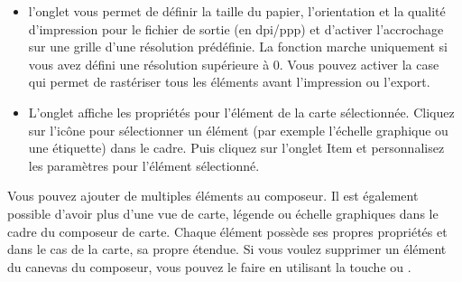 \begin{itemize}[label=--]
\item l'onglet  vous permet de définir la taille du papier, l'orientation et la qualité d'impression pour le fichier de sortie (en dpi/ppp) et d'activer l'accrochage sur une grille d'une résolution prédéfinie. La fonction  marche uniquement si vous avez défini une résolution supérieure à 0. Vous pouvez activer la case\\  qui permet de rastériser tous les éléments avant l'impression ou l'export.
\item L'onglet  affiche les propriétés pour l'élément de la carte sélectionnée. Cliquez sur l'icône   pour sélectionner un élément (par exemple l'échelle graphique ou une étiquette) dans le cadre. Puis cliquez sur l'onglet Item et personnalisez les paramètres pour l'élément sélectionné.
\end{itemize}

Vous pouvez ajouter de multiples éléments au composeur. Il est également possible d'avoir plus d'une vue de carte, légende ou échelle graphiques dans le
cadre du composeur de carte. Chaque élément possède ses propres propriétés et dans le cas de la carte, sa propre étendue. Si vous voulez supprimer un élément du canevas du composeur, vous pouvez le faire en utilisant la touche  ou .

